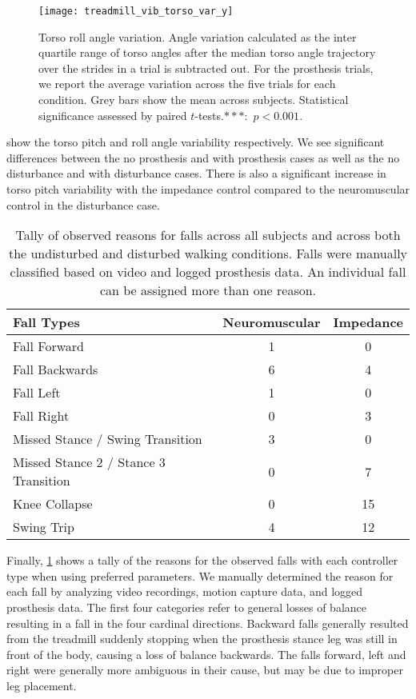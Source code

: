 \begin{figure}[t]
    \centering 
    \texttt{[image: treadmill\_vib\_torso\_var\_y]}
    \caption{Torso roll angle variation. Angle variation calculated as the inter
    quartile range of torso angles after the median torso angle trajectory over
    the strides in a trial is subtracted out. For the prosthesis trials, we
    report the average variation across the five trials for each condition.
    Grey bars show the mean across subjects.  Statistical significance assessed
    by paired $t$-tests.$***$:~$p < 0.001$.}\label{fig:treadmill_exp_torso_var_y}
\end{figure}

 show the
torso pitch and roll angle variability respectively. We see significant
differences between the no prosthesis and with prosthesis cases as well as the
no disturbance and with disturbance cases. There is also a significant increase
in torso pitch variability with the impedance control compared to the
neuromuscular control in the disturbance case.

\begin{table}[t]
  \begin{center}
    \begin{tabular}{lcc}
      Fall Types & Neuromuscular & Impedance \\
      \midrule
      Fall Forward &  1 &  0 \\
      Fall Backwards &  6 &  4 \\
      Fall Left &  1 &  0 \\
      Fall Right &  0 &  3 \\
      Missed Stance / Swing Transition &  3 &  0 \\
      Missed Stance 2 / Stance 3 Transition &  0 &  7 \\
      Knee Collapse & 0 & 15 \\
      Swing Trip & 4 & 12 \\
    \end{tabular}
  \end{center}
  \caption{Tally of observed reasons for falls across all subjects and across
  both the undisturbed and disturbed walking conditions. Falls were manually
  classified based on video and logged prosthesis data. An individual fall can
  be assigned more than one reason.}\label{tab:treadmill_exp_fall_reasons}
\end{table}
Finally, \cref{tab:treadmill_exp_fall_reasons} shows a tally of the reasons for
the observed falls with each controller type when using preferred parameters.
We manually determined the reason for each fall by analyzing video recordings,
motion capture data, and logged prosthesis data. The first four categories refer
to general losses of balance resulting in a fall in the four cardinal
directions. Backward falls generally resulted from the treadmill suddenly
stopping when the prosthesis stance leg was still in front of the body, causing
a loss of balance backwards. The falls forward, left and right were generally
more ambiguous in their cause, but may be due to improper leg placement. 

